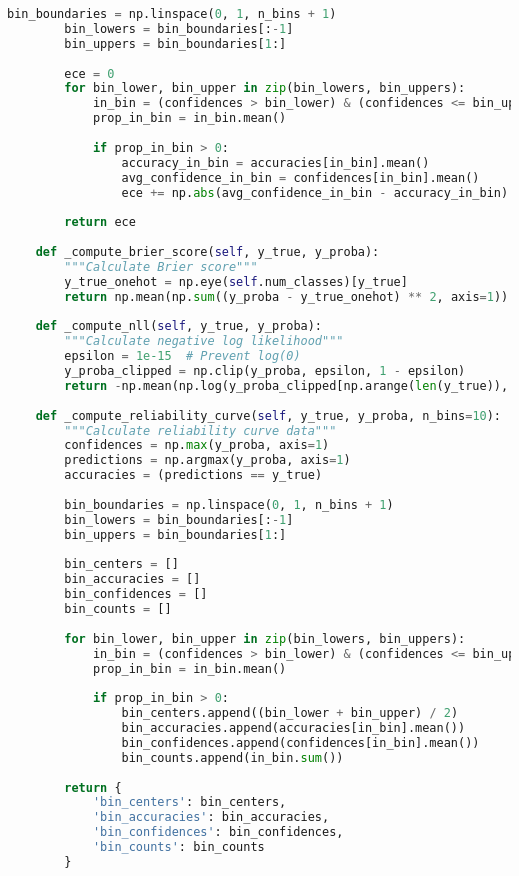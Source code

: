 \begin{lstlisting}[language=Python,caption=Implementation of Comprehensive Evaluation Metrics]
        bin_boundaries = np.linspace(0, 1, n_bins + 1)
        bin_lowers = bin_boundaries[:-1]
        bin_uppers = bin_boundaries[1:]
        
        ece = 0
        for bin_lower, bin_upper in zip(bin_lowers, bin_uppers):
            in_bin = (confidences > bin_lower) & (confidences <= bin_upper)
            prop_in_bin = in_bin.mean()
            
            if prop_in_bin > 0:
                accuracy_in_bin = accuracies[in_bin].mean()
                avg_confidence_in_bin = confidences[in_bin].mean()
                ece += np.abs(avg_confidence_in_bin - accuracy_in_bin) * prop_in_bin
        
        return ece
    
    def _compute_brier_score(self, y_true, y_proba):
        """Calculate Brier score"""
        y_true_onehot = np.eye(self.num_classes)[y_true]
        return np.mean(np.sum((y_proba - y_true_onehot) ** 2, axis=1))
    
    def _compute_nll(self, y_true, y_proba):
        """Calculate negative log likelihood"""
        epsilon = 1e-15  # Prevent log(0)
        y_proba_clipped = np.clip(y_proba, epsilon, 1 - epsilon)
        return -np.mean(np.log(y_proba_clipped[np.arange(len(y_true)), y_true]))
    
    def _compute_reliability_curve(self, y_true, y_proba, n_bins=10):
        """Calculate reliability curve data"""
        confidences = np.max(y_proba, axis=1)
        predictions = np.argmax(y_proba, axis=1)
        accuracies = (predictions == y_true)
        
        bin_boundaries = np.linspace(0, 1, n_bins + 1)
        bin_lowers = bin_boundaries[:-1]
        bin_uppers = bin_boundaries[1:]
        
        bin_centers = []
        bin_accuracies = []
        bin_confidences = []
        bin_counts = []
        
        for bin_lower, bin_upper in zip(bin_lowers, bin_uppers):
            in_bin = (confidences > bin_lower) & (confidences <= bin_upper)
            prop_in_bin = in_bin.mean()
            
            if prop_in_bin > 0:
                bin_centers.append((bin_lower + bin_upper) / 2)
                bin_accuracies.append(accuracies[in_bin].mean())
                bin_confidences.append(confidences[in_bin].mean())
                bin_counts.append(in_bin.sum())
        
        return {
            'bin_centers': bin_centers,
            'bin_accuracies': bin_accuracies,
            'bin_confidences': bin_confidences,
            'bin_counts': bin_counts
        }
\end{lstlisting}

